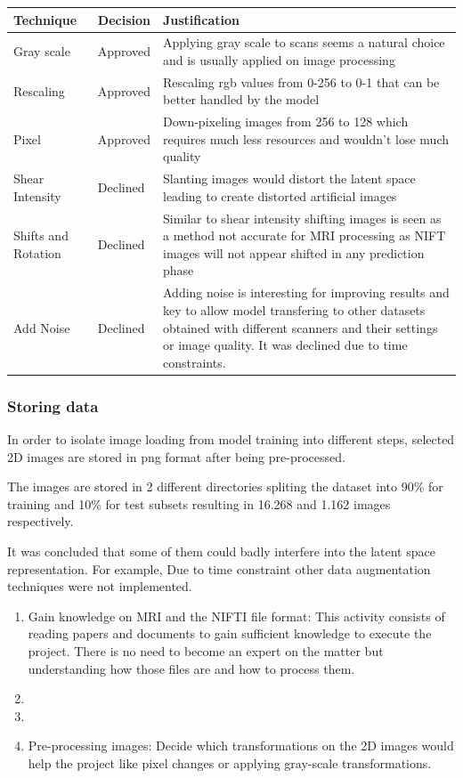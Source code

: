 \begin{table}
    \centering
    \begin{tabular}{p{3cm}|p{2cm}|p{6cm}}
        \hline
        Technique & Decision & Justification \\
        \hline
        Gray scale & Approved & Applying gray scale to scans seems a natural choice and is usually applied on image processing \\
        Rescaling & Approved & Rescaling \acrshort{rgb} values from 0-256 to 0-1 that can be better handled by the model  \\
        Pixel & Approved & Down-pixeling images from 256 to 128 which requires much less resources and wouldn't lose much quality \\
        Shear Intensity & Declined & Slanting images would distort the latent space leading to create distorted artificial images \\
        Shifts and Rotation & Declined & Similar to shear intensity shifting
            images is seen as a method not accurate for MRI processing as NIFT 
            images will not appear shifted in any prediction phase \\
        Add Noise & Declined & Adding noise is interesting for improving results and key to allow model transfering to other datasets obtained with different scanners and their settings or image quality. It was declined due to time constraints. \\
        \hline
    \end{tabular}
\end{table}

\subsubsection*{Storing data}

In order to isolate image loading from model training into different steps, selected 2D images are stored in \acrshort{png} format after being pre-processed. 

The images are stored in 2 different directories spliting the dataset into 90\% for training and 10\% for test subsets resulting in 16.268 and 1.162 images respectively.



It was concluded that some of them could badly interfere into the latent space representation. For example,  
Due to time constraint other data augmentation techniques were not implemented.

\begin{enumerate}
    \item Gain knowledge on MRI and the NIFTI file format: This activity consists of reading papers and documents to gain sufficient knowledge to execute the project. There is no need to become an expert on the matter but understanding how those files are and how to process them.
    \item 
    \item 
    \item Pre-processing images: Decide which transformations on the 2D images would help the project like pixel changes or applying gray-scale transformations.
\end{enumerate}

